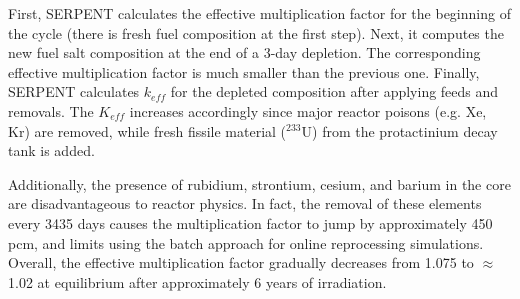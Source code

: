 First, SERPENT calculates the effective multiplication factor for the beginning 
of the cycle (there is fresh fuel composition at the first step). Next, it 
computes the new fuel salt composition at the end of a 3-day depletion. The 
corresponding effective multiplication factor is much smaller than the previous 
one. Finally, SERPENT calculates $k_{eff}$ for the depleted composition after 
applying feeds and removals. The $K_{eff}$ increases accordingly since major reactor 
poisons (e.g. Xe, Kr) are removed, while fresh fissile material ($^{233}$U) 
from the protactinium decay tank is added.  

Additionally, the presence of rubidium, strontium, cesium, and barium in the 
core are disadvantageous to reactor physics. In fact, the removal of these elements 
every 3435 days causes the multiplication factor to jump by approximately 450 
pcm, and limits using the batch approach for online reprocessing simulations. 
Overall, the effective multiplication factor gradually decreases from 1.075 to 
$\approx$1.02 at equilibrium after approximately 6 years of irradiation. 

